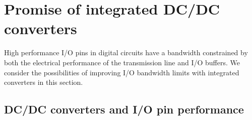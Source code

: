 \documentclass[letterpaper,twocolumn,10pt]{article}
\begin{document}
\section{Promise of integrated DC/DC converters}

High performance I/O pins in digital circuits have a bandwidth constrained by both the electrical performance of the transmission line and I/O buffers. We consider the possibilities of improving I/O bandwidth limits with integrated converters in this section. %

\subsection{DC/DC converters and I/O pin performance}
%
%
%
\end{document}
